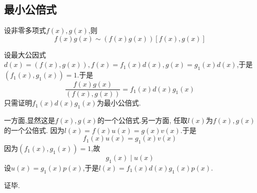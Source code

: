 \subsection{最小公倍式}
\begin{formal}
\begin{theorem}[最小公倍式存在性]\label{thm:最小公倍式存在性}
    设非零多项式$f\left(x\right),g\left(x\right)$,则\[
    f\left(x\right)g\left(x\right)\sim \left(f\left(x\right)g\left(x\right)\right)\left[f\left(x\right),g\left(x\right)\right]
    \]
\end{theorem}
\begin{Proof}
设最大公因式$d\left(x\right)=\left(f\left(x\right),g\left(x\right)\right),
f\left(x\right)=f_1\left(x\right)d\left(x\right),g\left(x\right)=g_1\left(x\right)d\left(x\right)$,于是$\left(
    f_1\left(x\right),g_1\left(x\right)
\right)=1.$于是\[
\frac{
    f\left(x\right)g\left(x\right)
}{\left(f\left(x\right),g\left(x\right)\right)}=f_1\left(x\right)d\left(x\right)g_1\left(x\right)
\]
只需证明$f_1\left(x\right)d\left(x\right)g_1\left(x\right)$为最小公倍式.

一方面,显然这是$f\left(x\right),g\left(x\right)$的一个公倍式.另一方面,
任取$l\left(x\right)$为$f\left(x\right),g\left(x\right)$的一个公倍式.
因为$l\left(x\right)=f\left(x\right)u\left(x\right)=g\left(x\right)
v\left(x\right)$.于是
\[
f_1\left(x\right)u\left(x\right)=g_1\left(x\right)v\left(x\right)
\]因为$\left(f_1\left(x\right),g_1\left(x\right)\right)=1$,故\[
g_1\left(x\right)\mid u\left(x\right)
\]
设$u\left(x\right)=g_1\left(x\right)p\left(x\right)$,于是$l\left(x\right)=f_1\left(x\right)d\left(x\right)g_1\left(x\right)p\left(x\right)$.

证毕.
\end{Proof}
\end{formal}

